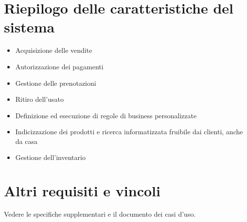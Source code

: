 \documentclass[a4paper,10pt]{report}
\begin{document}
  \section*{Riepilogo delle caratteristiche del sistema}
  \begin{itemize}
    \item Acquisizione delle vendite
    \item Autorizzazione dei pagamenti
    \item Gestione delle prenotazioni
    \item Ritiro dell'usato
    \item Definizione ed esecuzione di regole di business personalizzate
    \item Indicizzazione dei prodotti e ricerca informatizzata fruibile dai clienti, anche da casa
    \item Gestione dell'inventario
  \end{itemize}

  \section*{Altri requisiti e vincoli}
  Vedere le specifiche supplementari e il documento dei casi d'uso.
\end{document}
